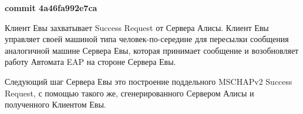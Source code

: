\documentclass[oneside, final, 14pt]{extarticle}
\begin{document}
%
%
%
%
%
%
%
%
%
%

\textbf{commit 4a46fa992e7ca}

Клиент Евы захватывает Success Request от Сервера Алисы.
Клиент Евы управляет своей машиной типа человек-по-середине
для пересылки сообщения аналогичной машине Сервера Евы,
которая принимает сообщение и возобновляет работу Автомата EAP
на стороне Сервера Евы.

Следующий шаг Сервера Евы это построение поддельного MSCHAPv2 Success Request,
с помощью такого же, сгенерированного Сервером Алисы и полученного Клиентом Евы.
\end{document}
